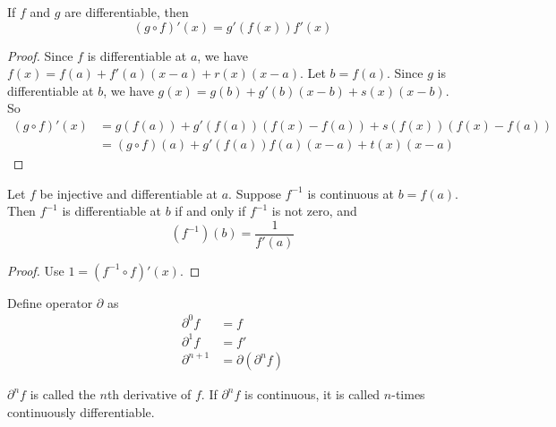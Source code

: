\begin{theorem}
    If $f$ and $g$ are differentiable, then
    \begin{equation}
        (g \circ f)'(x) = g'(f(x)) f'(x)
    \end{equation}    
\end{theorem}
\begin{proof}
    Since $f$ is differentiable at $a$, we have $f(x) = f(a) + f'(a)(x-a) + r(x)(x-a)$. Let $b = f(a)$. Since $g$ is differentiable at $b$, we have $g(x) = g(b) + g'(b)(x-b) + s(x)(x-b)$. So
    \begin{equation}
        \begin{aligned}
            (g \circ f)'(x) &= g(f(a)) + g'(f(a))(f(x) - f(a)) + s(f(x))(f(x) - f(a)) \\
            &= (g \circ f)(a) + g'(f(a))f(a)(x-a) + t(x)(x-a)
        \end{aligned}
    \end{equation}
\end{proof}

\begin{theorem}
    Let $f$ be injective and differentiable at $a$. Suppose $f^{-1}$ is continuous at $b=f(a)$. Then $f^{-1}$ is differentiable at $b$ if and only if $f^{-1}$ is not zero, and
    \begin{equation}
        (f^{-1})(b) = \frac{1}{f'(a)}
    \end{equation}
\end{theorem}
\begin{proof}
    Use $1 = (f^{-1} \circ f)'(x)$.
\end{proof}

\begin{definition}
    Define operator $\partial$ as
    \begin{equation}
        \begin{aligned}
            \partial^0 f &= f\\
            \partial^1 f &= f'\\
            \partial^{n+1} &= \partial(\partial^n f)
        \end{aligned}
    \end{equation}
    
    $\partial^n f$ is called the $n$th derivative of $f$. If $\partial^n f$ is continuous, it is called $n$-times continuously differentiable.
\end{definition}



